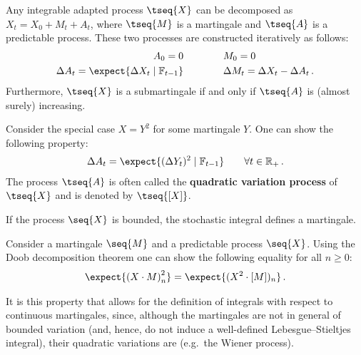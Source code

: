     \begin{theorem}
        Any integrable adapted process $\tseq{X}$ can be decomposed as $X_t=X_0+M_t+A_t$, where $\tseq{M}$ is a martingale and $\tseq{A}$ is a predictable process. These two processes are constructed iteratively as follows:
        \begin{align}
            A_0 = 0\qquad&\qquad M_0 = 0\\
            \Delta A_t = \expect{\Delta X_t\mid\mathbb{F}_{t-1}}\qquad&\qquad\Delta M_t = \Delta X_t - \Delta A_t\,.
        \end{align}
        Furthermore, $\tseq{X}$ is a submartingale if and only if $\tseq{A}$ is (almost surely) increasing.
    \end{theorem}
    \begin{result}
        Consider the special case $X=Y^2$ for some martingale $Y$. One can show the following property:
        \begin{gather}
            \Delta A_t = \expect{(\Delta Y_t)^2\mid\mathbb{F}_{t-1}}\qquad\forall t\in\mathbb{R}_+\,.
        \end{gather}
        The process $\tseq{A}$ is often called the \textbf{quadratic variation process} of $\tseq{X}$ and is denoted by $\tseq{[X]}$.
    \end{result}

    \begin{property}
        If the process $\seq{X}$ is bounded, the stochastic integral defines a martingale.
    \end{property}

    \begin{property}[It\^o isometry]
        Consider a martingale $\seq{M}$ and a predictable process $\seq{X}$. Using the Doob decomposition theorem one can show the following equality for all $n\geq0$:
        \begin{gather}
            \expect{\left(X\cdot M\right)_n^2} = \expect{(X^2\cdot[M])_n}\,.
        \end{gather}
    \end{property}
    It is this property that allows for the definition of integrals with respect to continuous martingales, since, although the martingales are not in general of bounded variation (and, hence, do not induce a well-defined Lebesgue--Stieltjes integral), their quadratic variations are (e.g.~the Wiener process).

